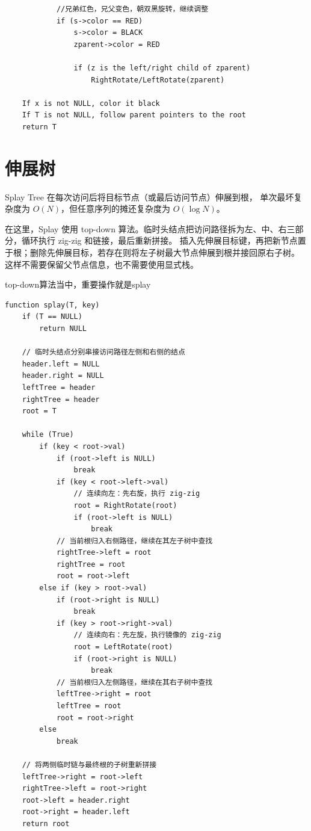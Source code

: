 \documentclass[openany]{book}
\begin{document}
\begin{lstlisting}
            //兄弟红色，兄父变色，朝双黑旋转，继续调整
            if (s->color == RED)
                s->color = BLACK
                zparent->color = RED

                if (z is the left/right child of zparent)
                    RightRotate/LeftRotate(zparent)

    If x is not NULL, color it black
    If T is not NULL, follow parent pointers to the root
    return T
\end{lstlisting}

\section{伸展树}
Splay Tree 在每次访问后将目标节点（或最后访问节点）伸展到根，
单次最坏复杂度为 $O(N)$，但任意序列的摊还复杂度为 $O(\log N)$。

在这里，Splay 使用 top-down 算法。临时头结点把访问路径拆为左、中、右三部分，循环执行 zig-zig 和链接，最后重新拼接。
插入先伸展目标键，再把新节点置于根；删除先伸展目标，若存在则将左子树最大节点伸展到根并接回原右子树。
这样不需要保留父节点信息，也不需要使用显式栈。

top-down算法当中，重要操作就是splay
\begin{lstlisting}
function splay(T, key)
    if (T == NULL)
        return NULL

    // 临时头结点分别串接访问路径左侧和右侧的结点
    header.left = NULL
    header.right = NULL
    leftTree = header
    rightTree = header
    root = T

    while (True)
        if (key < root->val)
            if (root->left is NULL)
                break
            if (key < root->left->val)
                // 连续向左：先右旋，执行 zig-zig
                root = RightRotate(root)
                if (root->left is NULL)
                    break
            // 当前根归入右侧路径，继续在其左子树中查找
            rightTree->left = root
            rightTree = root
            root = root->left
        else if (key > root->val)
            if (root->right is NULL)
                break
            if (key > root->right->val)
                // 连续向右：先左旋，执行镜像的 zig-zig
                root = LeftRotate(root)
                if (root->right is NULL)
                    break
            // 当前根归入左侧路径，继续在其右子树中查找
            leftTree->right = root
            leftTree = root
            root = root->right
        else
            break

    // 将两侧临时链与最终根的子树重新拼接
    leftTree->right = root->left
    rightTree->left = root->right
    root->left = header.right
    root->right = header.left
    return root

\end{lstlisting}
\end{document}
